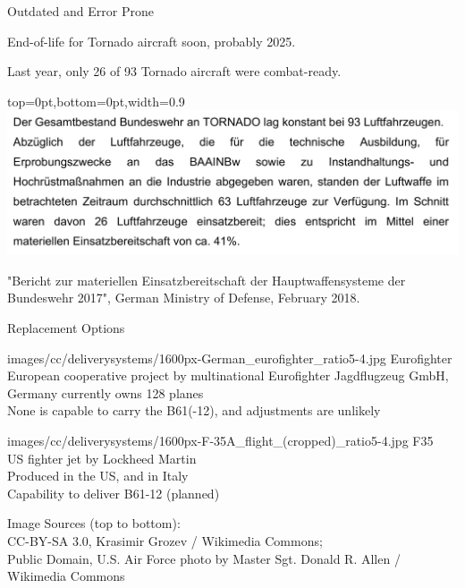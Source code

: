 \documentclass[presentation]{beamer}
\begin{document}
\begin{frame}[label={sec:orge9be90d}]{Outdated and Error Prone}
\begin{center}

End-of-life for Tornado aircraft soon, probably 2025.

Last year, only 26 of 93 Tornado aircraft were combat-ready.\\[1em]

\begin{tornpagetb}[fill=white]{top=0pt,bottom=0pt,width=0.9\textwidth}
  \includegraphics[width=\textwidth]{localimages/quotes/BMV-2018-tornado.png}
\end{tornpagetb}
\scriptsize "Bericht zur materiellen Einsatzbereitschaft der Hauptwaffensysteme der Bundeswehr 2017", German Ministry of Defense, February 2018.


\end{center}
\end{frame}

\begin{frame}[label={sec:org387a213}]{Replacement Options}
\begin{imagebox2rows}[lefthand width=3.75cm]{images/cc/deliverysystems/1600px-German_eurofighter_ratio5-4.jpg}
\alert{Eurofighter} \\
\scriptsize
European cooperative project by multinational Eurofighter Jagdflugzeug GmbH, Germany currently owns 128 planes\\[0.1em]
None is capable to carry the B61(-12), and adjustments are unlikely
\end{imagebox2rows}

\begin{imagebox2rows}[lefthand width=3.75cm]{images/cc/deliverysystems/1600px-F-35A_flight_(cropped)_ratio5-4.jpg}
\alert{F35} \\
\scriptsize
US fighter jet by Lockheed Martin \\[0.1em]
Produced in the US, and in Italy \\[0.1em]
Capability to deliver B61-12 (planned)
\end{imagebox2rows}

\vvtiny Image Sources (top to bottom): \\CC-BY-SA 3.0, Krasimir Grozev / Wikimedia Commons; \\Public Domain, U.S. Air Force photo by Master Sgt. Donald R. Allen / Wikimedia Commons

\end{frame}
\end{document}

